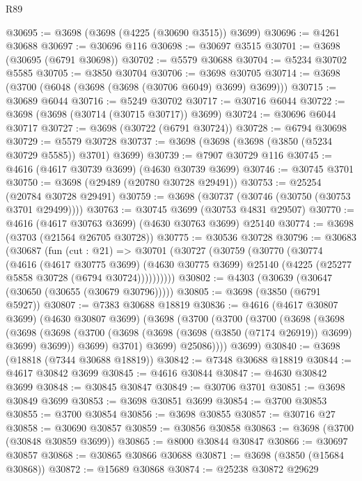 \begin{lexlean}{R89}
\begin{coremodule}
@30695 := @3698 (@3698 (@4225 (@30690 @3515)) @3699)
@30696 := @4261 @30688
@30697 := @30696 @116
@30698 := @30697 @3515
@30701 := @3698 (@30695 (@6791 @30698))
@30702 := @5579 @30688
@30704 := @5234 @30702 @5585
@30705 := @3850 @30704
@30706 := @3698 @30705
@30714 := @3698 (@3700 (@6048 (@3698 (@3698 (@30706 @6049) @3699) @3699)))
@30715 := @30689 @6044
@30716 := @5249 @30702
@30717 := @30716 @6044
@30722 := @3698 (@3698 (@30714 (@30715 @30717)) @3699)
@30724 := @30696 @6044 @30717
@30727 := @3698 (@30722 (@6791 @30724))
@30728 := @6794 @30698
@30729 := @5579 @30728
@30737 := @3698 (@3698 (@3698 (@3850 (@5234 @30729 @5585)) @3701) @3699)
@30739 := @7907 @30729 @116
@30745 := @4616 (@4617 @30739 @3699) (@4630 @30739 @3699)
@30746 := @30745 @3701
@30750 := @3698 (@29489 (@20780 @30728 @29491))
@30753 := @25254 (@20784 @30728 @29491)
@30759 := @3698 (@30737 (@30746 (@30750 (@30753 @3701 @29499))))
@30763 := @30745 @3699 (@30753 @4831 @29507)
@30770 := @4616 (@4617 @30763 @3699) (@4630 @30763 @3699) @25140
@30774 := @3698 (@3703 (@21564 @26705 @30728))
@30775 := @30536 @30728
@30796 := @30683
    (@30687
      (fun (cut : @21) =>
      @30701
        (@30727
          (@30759
            (@30770
              (@30774
                (@4616
                  (@4617 @30775 @3699)
                  (@4630 @30775 @3699)
                  @25140
                  (@4225 (@25277 @5858 @30728 (@6794 @30724))))))))))
@30802 := @4303 (@30639 (@30647 (@30650 (@30655 (@30679 @30796)))))
@30805 := @3698 (@3850 (@6791 @5927))
@30807 := @7383 @30688 @18819
@30836 := @4616
    (@4617 @30807 @3699)
    (@4630 @30807 @3699)
    (@3698
      (@3700
        (@3700
          (@3700
            (@3698
              (@3698
                (@3698
                  (@3698
                    (@3700 (@3698 (@3698 (@3698 (@3850 (@7174 @26919)) @3699) @3699) @3699))
                    @3699)
                  @3701)
                @3699)
              @25086))))
      @3699)
@30840 := @3698 (@18818 (@7344 @30688 @18819))
@30842 := @7348 @30688 @18819
@30844 := @4617 @30842 @3699
@30845 := @4616 @30844
@30847 := @4630 @30842 @3699
@30848 := @30845 @30847
@30849 := @30706 @3701
@30851 := @3698 @30849 @3699
@30853 := @3698 @30851 @3699
@30854 := @3700 @30853
@30855 := @3700 @30854
@30856 := @3698 @30855
@30857 := @30716 @27
@30858 := @30690 @30857
@30859 := @30856 @30858
@30863 := @3698 (@3700 (@30848 @30859 @3699))
@30865 := @8000 @30844 @30847
@30866 := @30697 @30857
@30868 := @30865 @30866 @30688
@30871 := @3698 (@3850 (@15684 @30868))
@30872 := @15689 @30868
@30874 := @25238 @30872 @29629

\end{coremodule}
\end{lexlean}
